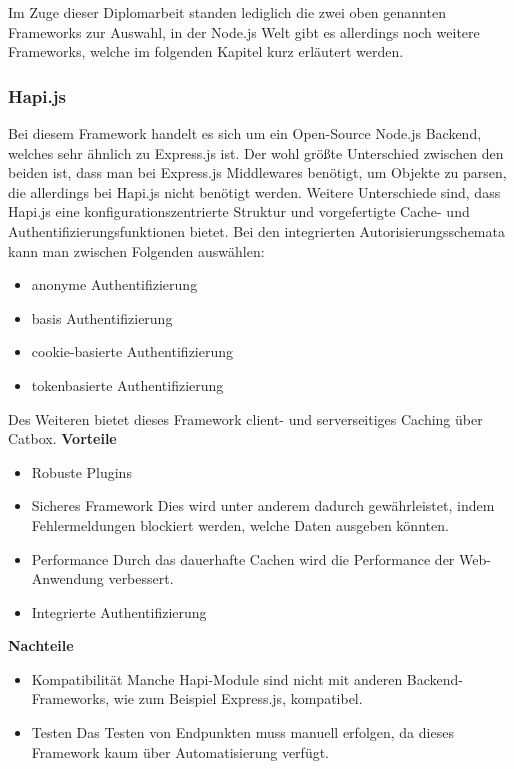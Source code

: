 Im Zuge dieser Diplomarbeit standen lediglich die zwei oben genannten Frameworks zur Auswahl, in der Node.js Welt gibt es allerdings noch weitere Frameworks, welche im folgenden Kapitel kurz erläutert werden.

\subsubsection{Hapi.js}
Bei diesem Framework handelt es sich um ein Open-Source Node.js Backend, welches sehr ähnlich zu Express.js ist. Der wohl größte Unterschied zwischen den beiden ist, dass man bei Express.js Middlewares benötigt, um Objekte zu parsen, die allerdings bei Hapi.js nicht benötigt werden. Weitere Unterschiede sind, dass Hapi.js eine konfigurationszentrierte Struktur und vorgefertigte Cache- und Authentifizierungsfunktionen bietet. Bei den integrierten Autorisierungsschemata kann man zwischen Folgenden auswählen:
\begin{itemize}
    \item anonyme Authentifizierung
    \item basis Authentifizierung
    \item cookie-basierte Authentifizierung
    \item tokenbasierte Authentifizierung
\end{itemize}
Des Weiteren bietet dieses Framework client- und serverseitiges Caching über Catbox.
\newline
\textbf{Vorteile}
\begin{itemize}
    \item Robuste Plugins
    \item Sicheres Framework
        \newline
        Dies wird unter anderem dadurch gewährleistet, indem Fehlermeldungen blockiert werden, welche Daten ausgeben könnten.
    \item Performance
        \newline
        Durch das dauerhafte Cachen wird die Performance der Web-Anwendung verbessert.
    \item Integrierte Authentifizierung
\end{itemize}
\newpage
\textbf{Nachteile}
\begin{itemize}
    \item Kompatibilität
        \newline
        Manche Hapi-Module sind nicht mit anderen Backend-Frameworks, wie zum Beispiel Express.js, kompatibel.
    \item Testen
        \newline
        Das Testen von Endpunkten muss manuell erfolgen, da dieses Framework kaum über Automatisierung verfügt.
\end{itemize}
\cite{backend_hapi}

